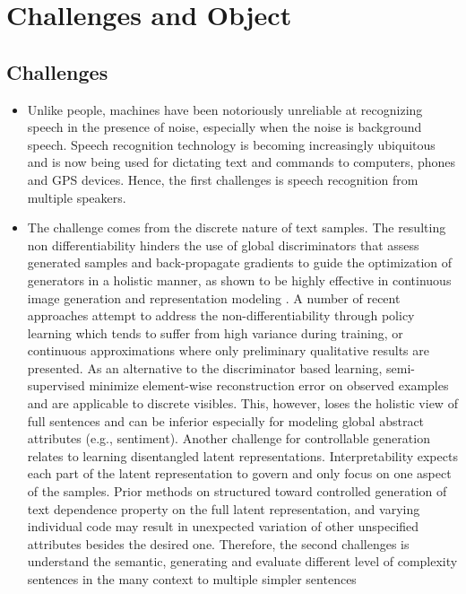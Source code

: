 \documentclass[letterpaper%
, twoside%
, 12pt%
,these%
, english%
,creativecommons,hyperref%
]{thETS}
\begin{document}
\chapter{Challenges and Object}

\section{Challenges}
\begin{itemize}
	\item  Unlike people, machines have been notoriously unreliable at recognizing speech in the
	presence of noise, especially when the noise is background speech. Speech recognition
	technology is becoming increasingly ubiquitous and is now being used for dictating text
	and commands to computers, phones and GPS devices. Hence, the first challenges is speech
	recognition from multiple speakers.
	\item  The challenge comes from the discrete nature of text samples. The resulting non differentiability
	hinders the use of global discriminators that assess generated samples and back-propagate
	gradients to guide the optimization of generators in a holistic manner, as shown to be highly
	effective in continuous image generation and representation modeling \cite{C. Xi, Lindbo,Diederik}. A number
	of recent approaches attempt to address the non-differentiability through policy learning
	\cite{Alexey} which tends to suffer from high variance during training, or continuous approximations
	\cite{Lantao,Yizhe} where only preliminary qualitative results are presented. As an alternative to the
	discriminator based learning, semi-supervised \cite{Diederik} minimize element-wise reconstruction
	error on observed examples and are applicable to discrete visibles. This, however, loses the
	holistic view of full sentences and can be inferior especially for modeling global abstract attributes
	(e.g., sentiment). Another challenge for controllable generation relates to learning
	disentangled latent representations. Interpretability expects each part of the latent representation
	to govern and only focus on one aspect of the samples. Prior methods \cite{C. Xi,Augustus}
	on structured toward controlled generation of text dependence property on the full latent
	representation, and varying individual code may result in unexpected variation of other unspecified
	attributes besides the desired one. Therefore, the second challenges is understand
	the semantic, generating and evaluate different level of complexity sentences in the many
	context to multiple simpler sentences
\end{itemize}
\end{document}

